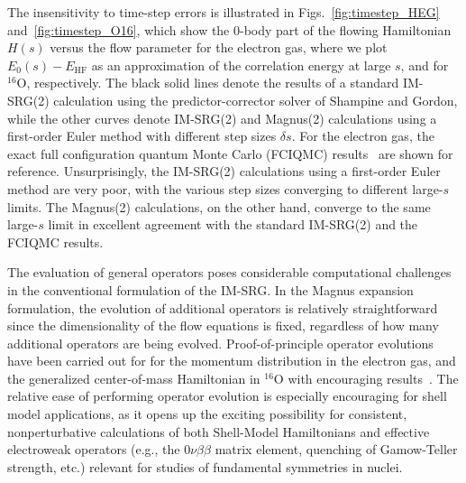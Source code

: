 The insensitivity to time-step errors is illustrated in
Figs.~\ref{fig:timestep_HEG} and~\ref{fig:timestep_O16}, which show
the 0-body part of the flowing Hamiltonian $H(s)$ versus the flow
parameter for the electron gas, where we plot $E_0(s)-E_\text{HF}$ as an
approximation of the correlation energy at large $s$, and for
$^{16}$O, respectively. The black solid lines denote the results of a
standard IM-SRG(2) calculation using the predictor-corrector solver of
Shampine and Gordon, while the other curves denote IM-SRG(2) and
Magnus(2) calculations using a first-order Euler method with different
step sizes $\delta s$. For the electron gas, the exact full
configuration quantum Monte Carlo (FCIQMC)
results~\cite{Shepherd:2012hl} are shown for
reference. Unsurprisingly, the IM-SRG(2) calculations using a
first-order Euler method are very poor, with the various step sizes
converging to different large-$s$ limits. The Magnus(2) calculations,
on the other hand, converge to the same large-$s$ limit in excellent
agreement with the standard IM-SRG(2) and the FCIQMC results.

The evaluation of general operators poses considerable computational
challenges in the conventional formulation of the IM-SRG. In the
Magnus expansion formulation, the evolution of additional operators is
relatively straightforward since the dimensionality of the flow
equations is fixed, regardless of how many additional operators are
being evolved. Proof-of-principle operator evolutions have been
carried out for for the momentum distribution in the electron gas, and
the generalized center-of-mass Hamiltonian in $^{16}$O with encouraging
results~\cite{Morris:2015ve}.  The relative ease of performing
operator evolution is especially encouraging for shell model
applications, as it opens up the exciting possibility for consistent,
nonperturbative calculations of both Shell-Model Hamiltonians and
effective electroweak operators (e.g., the $0\nu\beta\beta$ matrix
element, quenching of Gamow-Teller strength, etc.) relevant for
studies of fundamental symmetries in nuclei.



